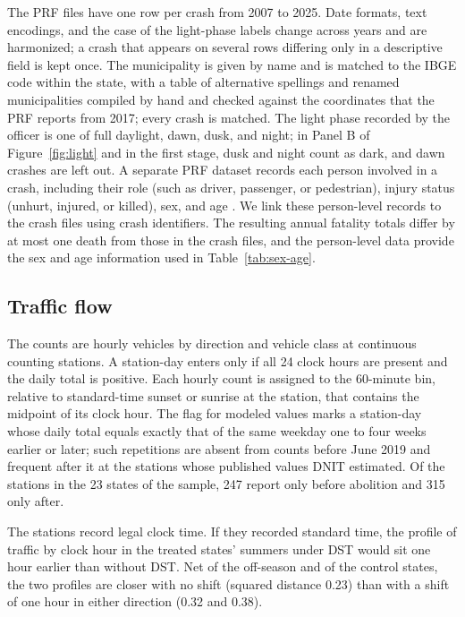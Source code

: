 The PRF files have one row per crash from 2007 to 2025. Date formats, text encodings, and the case of the light-phase labels change across years and are harmonized; a crash that appears on several rows differing only in a descriptive field is kept once. The municipality is given by name and is matched to the IBGE code within the state, with a table of alternative spellings and renamed municipalities compiled by hand and checked against the coordinates that the PRF reports from 2017; every crash is matched. The light phase recorded by the officer is one of full daylight, dawn, dusk, and night; in Panel B of Figure~\ref{fig:light} and in the first stage, dusk and night count as dark, and dawn crashes are left out. A separate PRF dataset records each person involved in a crash, including their role (such as driver, passenger, or pedestrian), injury status (unhurt, injured, or killed), sex, and age \citep{prf2025pessoas}. We link these person-level records to the crash files using crash identifiers. The resulting annual fatality totals differ by at most one death from those in the crash files, and the person-level data provide the sex and age information used in Table~\ref{tab:sex-age}.

\subsection{Traffic flow}

The counts are hourly vehicles by direction and vehicle class at continuous counting stations. A station-day enters only if all 24 clock hours are present and the daily total is positive. Each hourly count is assigned to the 60-minute bin, relative to standard-time sunset or sunrise at the station, that contains the midpoint of its clock hour. The flag for modeled values marks a station-day whose daily total equals exactly that of the same weekday one to four weeks earlier or later; such repetitions are absent from counts before June 2019 and frequent after it at the stations whose published values DNIT estimated. Of the stations in the 23 states of the sample, 247 report only before abolition and 315 only after. %

The stations record legal clock time. If they recorded standard time, the profile of traffic by clock hour in the treated states' summers under DST would sit one hour earlier than without DST. Net of the off-season and of the control states, the two profiles are closer with no shift (squared distance 0.23) than with a shift of one hour in either direction (0.32 and 0.38). %

